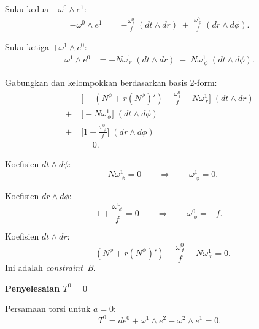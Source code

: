 Suku kedua $-\omega^0 \wedge e^1$:
\begin{align}
    -\omega^0 \wedge e^1 &= -\frac{\omega^0_{\ t}}{f}\;(dt \wedge dr) \;+\; \frac{\omega^0_{\ \phi}}{f}\;(dr \wedge d\phi). \label{b42-eq:T2-prod2}
\end{align}
 
Suku ketiga $+\omega^1 \wedge e^0$:
\begin{align}
    \omega^1 \wedge e^0 &= -N\omega^1_{\ r}\;(dt \wedge dr) \;-\; N\omega^1_{\ \phi}\;(dt \wedge d\phi). \label{b42-eq:T2-prod3}
\end{align}
 
Gabungkan dan kelompokkan berdasarkan basis 2-form:
\begin{align}
    &\Big[-(N^\phi + r(N^\phi)') - \frac{\omega^0_{\ t}}{f} - N\omega^1_{\ r}\Big]\;(dt \wedge dr) \nonumber\\[6pt]
    +\;&\Big[-N\omega^1_{\ \phi}\Big]\;(dt \wedge d\phi) \nonumber\\[6pt]
    +\;&\Big[1 + \frac{\omega^0_{\ \phi}}{f}\Big]\;(dr \wedge d\phi) \nonumber\\[6pt]
    &= 0. \label{b42-eq:T2-grouped}
\end{align}
 
\noindent Koefisien $dt \wedge d\phi$:
\begin{equation}
    -N\omega^1_{\ \phi} = 0 \qquad \Longrightarrow \qquad \omega^1_{\ \phi} = 0. \label{b42-eq:res-w1phi}
\end{equation}
 
\noindent Koefisien $dr \wedge d\phi$:
\begin{equation}
    1 + \frac{\omega^0_{\ \phi}}{f} = 0 \qquad \Longrightarrow \qquad \omega^0_{\ \phi} = -f. \label{b42-eq:res-w0phi}
\end{equation}
 
\noindent Koefisien $dt \wedge dr$:
\begin{equation}
    -(N^\phi + r(N^\phi)') - \frac{\omega^0_{\ t}}{f} - N\omega^1_{\ r} = 0. \label{b42-eq:constraint-B}
\end{equation}
Ini adalah \emph{constraint~B}.
 
\vspace{0.5em}
\noindent \textbf{Penyelesaian $T^0 = 0$}

Persamaan torsi untuk $a = 0$:
\begin{equation}
    T^0 = de^0 + \omega^1 \wedge e^2 - \omega^2 \wedge e^1 = 0. \label{b42-eq:T0-start}
\end{equation}
 
